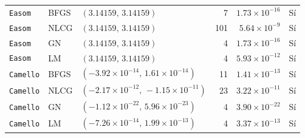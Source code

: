 \begin{tabular}{l l l r r c}
\texttt{Easom} & BFGS & $(3.14159,\,3.14159)$ & 7 & $1.73\times10^{-16}$ & Sí \\
\texttt{Easom} & NLCG & $(3.14159,\,3.14159)$ & 101 & $5.64\times10^{-9}$ & Sí \\
\texttt{Easom} & GN & $(3.14159,\,3.14159)$ & 4 & $1.73\times10^{-16}$ & Sí \\
\texttt{Easom} & LM & $(3.14159,\,3.14159)$ & 4 & $5.93\times10^{-12}$ & Sí \\
\texttt{Camello} & BFGS & $(-3.92\times10^{-14},\,1.61\times10^{-14})$ & 11 & $1.41\times10^{-13}$ & Sí \\
\texttt{Camello} & NLCG & $(-2.17\times10^{-12},\,-1.15\times10^{-11})$ & 23 & $3.22\times10^{-11}$ & Sí \\
\texttt{Camello} & GN & $(-1.12\times10^{-22},\,5.96\times10^{-23})$ & 4 & $3.90\times10^{-22}$ & Sí \\
\texttt{Camello} & LM & $(-7.26\times10^{-14},\,1.99\times10^{-13})$ & 4 & $3.37\times10^{-13}$ & Sí \\
\bottomrule
\end{tabular}
